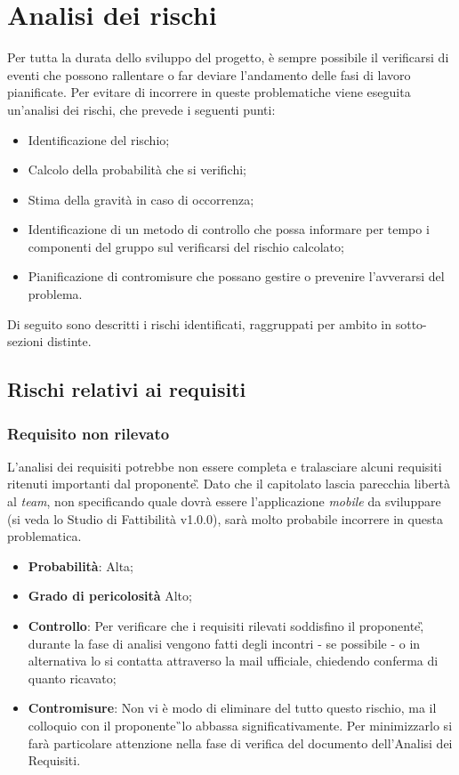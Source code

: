 \section{Analisi dei rischi}
Per tutta la durata dello sviluppo del progetto, è sempre possibile il verificarsi di eventi che possono rallentare o far deviare l'andamento delle fasi di lavoro pianificate. Per evitare di incorrere in queste problematiche viene eseguita un'analisi dei rischi, che prevede i seguenti punti:
\begin{itemize}
\item Identificazione del rischio;
\item Calcolo della probabilità che si verifichi;
\item Stima della gravità in caso di occorrenza;
\item Identificazione di un metodo di controllo che possa informare per tempo i componenti del gruppo sul verificarsi del rischio calcolato;
\item Pianificazione di contromisure che possano gestire o prevenire l'avverarsi del problema.
\end{itemize}
Di seguito sono descritti i rischi identificati, raggruppati per ambito in sotto-sezioni distinte.

\subsection{Rischi relativi ai requisiti}

\subsubsection{Requisito non rilevato}
\label{sec:ReqNonRil}
L'analisi dei requisiti potrebbe non essere completa e tralasciare alcuni requisiti ritenuti importanti dal proponente\G. Dato che il capitolato lascia parecchia libertà al \textit{team}, non specificando quale dovrà essere l'applicazione \textit{mobile} da sviluppare (si veda lo Studio di Fattibilità v1.0.0), sarà molto probabile incorrere in questa problematica. 
\begin{itemize}
\item \textbf{Probabilità}: Alta;
\item \textbf{Grado di pericolosità} Alto;
\item \textbf{Controllo}: Per verificare che i requisiti rilevati soddisfino il proponente\G, durante la fase di analisi vengono fatti degli incontri - se possibile - o in alternativa lo si contatta attraverso la mail ufficiale, chiedendo conferma di quanto ricavato;
\item \textbf{Contromisure}: Non vi è modo di eliminare del tutto questo rischio, ma il colloquio con il proponente\G\ lo abbassa significativamente. Per minimizzarlo si farà particolare attenzione nella fase di verifica del documento dell'Analisi dei Requisiti.
\end{itemize}

